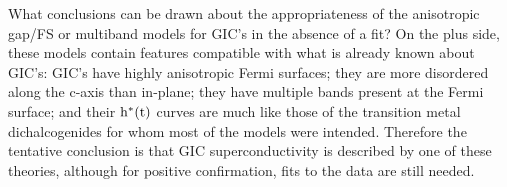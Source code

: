         What conclusions can  be drawn  about  the appropriateness  of  the
anisotropic gap/FS or multiband models for  GIC's in the  absence of a fit?
On  the plus side, these  models contain features  compatible  with what is
already  known about GIC's: GIC's  have highly anisotropic  Fermi surfaces;
they are more disordered along the c-axis than in-plane; they have multiple
bands present at the Fermi surface; and their  $\rm h^*(t)$ curves are much
like those  of the transition metal dichalcogenides  for whom most  of  the
models  were intended.   Therefore the  tentative  conclusion is  that  GIC
superconductivity is  described by  one  of these  theories,   although for
positive confirmation, fits to the data are still needed.




